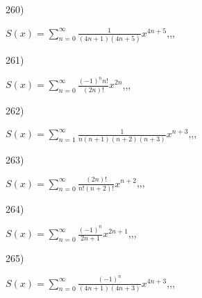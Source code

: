 \documentclass[11pt, ukrainian]{article}
\begin{document}
\par
\vspace{0.9cm}
260) \space 
{%
{$S(x)=\sum\limits_{n=0}^{\infty}{\frac{1}{(4n+1)(4n+5)}}{x^{{4n+5}}}$},,, \par \smallskip  
}
\par
\newpage
261) \space 
{%
{$S(x)=\sum\limits_{n=0}^{\infty}{\frac{{(-1)^n}{n!}}{(2n)!}}{x^{{2n}}}$},,, \par \smallskip  
}
\par
\vspace{0.9cm}
262) \space 
{%
{$S(x)=\sum\limits_{n=1}^{\infty}{\frac{1}{n(n+1)(n+2)(n+3)}}{x^{{n+3}}}$},,, \par \smallskip  
}
\par
\vspace{0.9cm}
263) \space 
{%
{$S(x)=\sum\limits_{n=0}^{\infty}{\frac{(2n)!}{n!(n+2)!}}{x^{{n+2}}}$},,, \par \smallskip  
}
\par
\vspace{0.9cm}
264) \space 
{%
{$S(x)=\sum\limits_{n=0}^{\infty}{\frac{(-1)^{n}}{2n+1}}{x^{{2n+1}}}$},,, \par \smallskip  
}
\par
\vspace{0.9cm}
265) \space 
{%
{$S(x)=\sum\limits_{n=0}^{\infty}{\frac{(-1)^n}{(4n+1)(4n+3)}}{x^{{4n+3}}}$},,, \par \smallskip  
}
\end{document}
